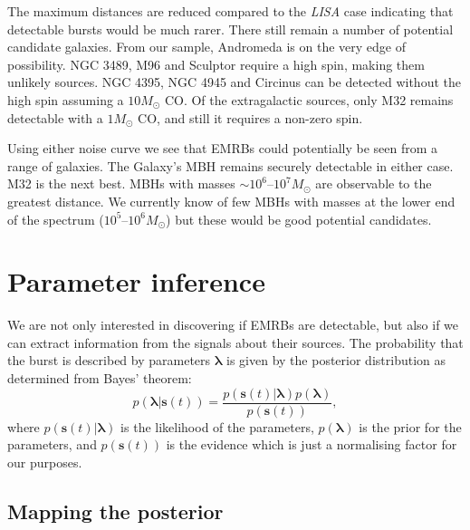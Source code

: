 \documentclass[useAMS,usedcolumn,usegraphicx,usenatbib]{mn2e}
\begin{document}
The maximum distances are reduced compared to the \textit{LISA} case indicating that detectable bursts would be much rarer. There still remain a number of potential candidate galaxies. From our sample, Andromeda is on the very edge of possibility. NGC 3489, M96 and Sculptor require a high spin, making them unlikely sources. NGC 4395, NGC 4945 and Circinus can be detected without the high spin assuming a $10 M_\odot$ CO. Of the extragalactic sources, only M32 remains detectable with a $1 M_\odot$ CO, and still it requires a non-zero spin.

Using either noise curve we see that EMRBs could potentially be seen from a range of galaxies. The Galaxy's MBH remains securely detectable in either case. M32 is the next best. MBHs with masses $\sim 10^6$--$10^7 M_\odot$ are observable to the greatest distance. We currently know of few MBHs with masses at the lower end of the spectrum ($10^5$--$10^6 M_\odot$) but these would be good potential candidates.

\section{Parameter inference}\label{sec:Infer}

We are not only interested in discovering if EMRBs are detectable, but also if we can extract information from the signals about their sources. The probability that the burst is described by parameters $\boldsymbol{\lambda}$ is given by the posterior distribution as determined from Bayes' theorem:
\begin{equation}
p(\boldsymbol{\lambda}|\boldsymbol{s}(t)) = \frac{p(\boldsymbol{s}(t)|\boldsymbol{\lambda})p(\boldsymbol{\lambda})}{p(\boldsymbol{s}(t))},
\end{equation}
where $p(\boldsymbol{s}(t)|\boldsymbol{\lambda})$ is the likelihood of the parameters, $p(\boldsymbol{\lambda})$ is the prior for the parameters, and $p(\boldsymbol{s}(t))$ is the evidence which is just a normalising factor for our purposes.

\subsection{Mapping the posterior}\label{sec:MCMC}
\end{document}
